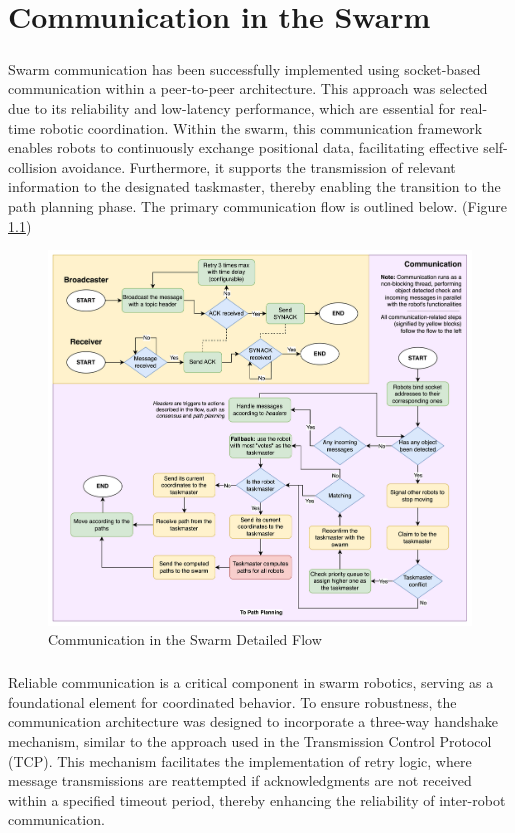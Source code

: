 \chapter{Communication in the Swarm}

\paragraph*{}
Swarm communication has been successfully implemented using socket-based communication within a peer-to-peer architecture. This approach was selected due to its reliability and low-latency performance, which are essential for real-time robotic coordination. Within the swarm, this communication framework enables robots to continuously exchange positional data, facilitating effective self-collision avoidance. Furthermore, it supports the transmission of relevant information to the designated taskmaster, thereby enabling the transition to the path planning phase. The primary communication flow is outlined below. (Figure \ref{fig:communication-flow})

\begin{figure}[H]
    \centering
    \includegraphics[width=0.85\linewidth]{assets/images/communication/communication-flow.png}
    \caption{Communication in the Swarm Detailed Flow}
    \label{fig:communication-flow}
\end{figure}


\paragraph*{}
Reliable communication is a critical component in swarm robotics, serving as a foundational element for coordinated behavior. To ensure robustness, the communication architecture was designed to incorporate a three-way handshake mechanism, similar to the approach used in the Transmission Control Protocol (TCP). This mechanism facilitates the implementation of retry logic, where message transmissions are reattempted if acknowledgments are not received within a specified timeout period, thereby enhancing the reliability of inter-robot communication.

